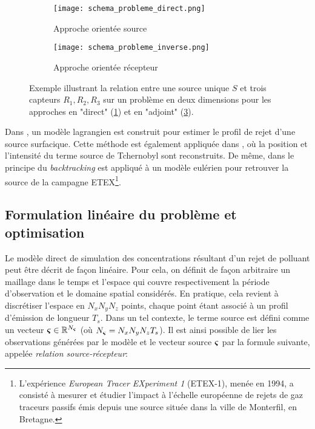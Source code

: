  \begin{figure}[h]
 	\begin{subfigure}{0.5\textwidth}
 		\texttt{[image: schema\_probleme\_direct.png]}
 		\caption{Approche orientée source}
 		\label{schema_probleme_direct}
 	\end{subfigure}
 	\begin{subfigure}{0.5\textwidth}
 		\texttt{[image: schema\_probleme\_inverse.png]}
 		\caption{Approche orientée récepteur}
 		\label{schema_probleme_inverse}
 	\end{subfigure}
 	\caption{Exemple illustrant la relation entre une source unique $S$ et trois capteurs $R_1,R_2,R_3$ sur un problème en deux dimensions pour les approches en "direct" (\ref{schema_probleme_direct}) et en "adjoint" (\ref{schema_probleme_inverse}). }
 \end{figure}
 
 Dans \cite{Flesch1995}, un modèle  lagrangien est construit pour estimer le profil de rejet d'une source surfacique.  Cette méthode est également appliquée dans \cite{Pudykiewicz1998}, où la position et l'intensité du terme source de Tchernobyl sont reconstruits. De même, dans \cite{Hourdin2006b} le principe du \textit{backtracking} est appliqué à un modèle eulérien pour retrouver la source de la campagne ETEX\footnote{L’expérience \textit{European Tracer EXperiment 1} (ETEX-1), menée en 1994,  a consisté à mesurer et étudier l'impact à l'échelle européenne de rejets de gaz traceurs passifs émis depuis une source située dans la ville de Monterfil, en Bretagne.}.\\
 
 \subsection{Formulation linéaire du problème et optimisation}
 \label{subsection_MCO}
 
Le modèle direct de simulation des concentrations résultant d'un rejet de polluant peut être décrit de façon linéaire. Pour cela, on définit de façon arbitraire un maillage dans le temps et l'espace qui couvre respectivement la période d'observation et le domaine spatial considérés. En pratique, cela revient à discrétiser l'espace en $N_xN_yN_z$ points, chaque point étant associé à un profil d'émission de longueur $T_s$. Dans un tel contexte, le terme source est défini comme un vecteur ${\bm{\varsigma}} \in \mathbb{R}^{N_{\bm{\varsigma}}}$ (où $N_{\bm{\varsigma}} = N_xN_yN_zT_s$). Il est ainsi possible de lier les observations générées par le modèle et le vecteur source ${\bm{\varsigma}}$ par la formule suivante, appelée \textit{relation source-récepteur}:

